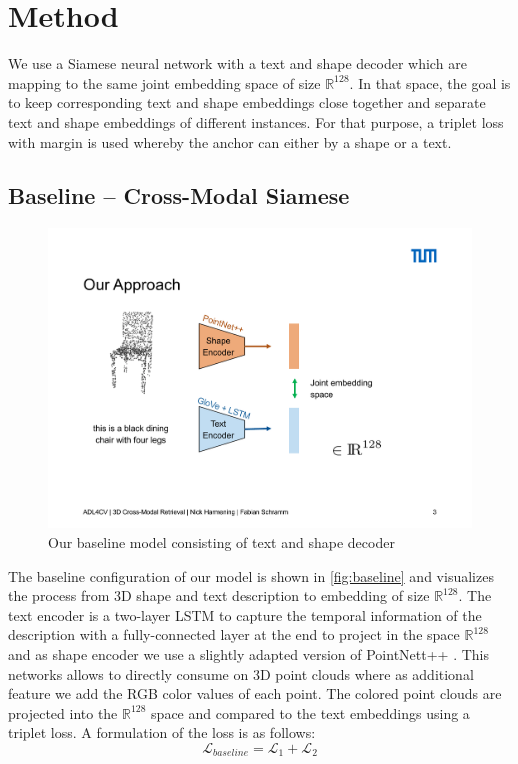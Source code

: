 \documentclass[10pt,twocolumn,letterpaper]{article}
\begin{document}
\section{Method}
We use a Siamese neural network with a text and shape decoder which are mapping to the same joint embedding space of size $\mathbb{R}^{128}$. In that space, the goal is to keep corresponding text and shape embeddings close together and separate text and shape embeddings of different instances. For that purpose, a triplet loss with margin is used whereby the anchor can either by a shape or a text. 
\subsection{Baseline -- Cross-Modal Siamese}
\begin{figure}[t]%
	\centering
	\includegraphics[width=0.8\linewidth]{fig3.pdf}
	\caption[]{Our baseline model consisting of text and shape decoder}
	\label{fig:baseline}
\end{figure}
The baseline configuration of our model is shown in \autoref{fig:baseline} and visualizes the process from 3D shape and text description to embedding of size $\mathbb{R}^{128}$. The text encoder is a two-layer LSTM to capture the temporal information of the description with a fully-connected layer at the end to project in the space $\mathbb{R}^{128}$ and as shape encoder we use a slightly adapted version of PointNett++ \cite{qi2017Pointnet++}. This networks allows to directly consume on 3D point clouds where as additional feature we add the RGB color values of each point. The colored point clouds are projected into the $\mathbb{R}^{128}$ space and compared to the text embeddings using a triplet loss. A formulation of the loss is as follows:
\begin{equation}
\label{eqn:1}
\mathcal{L}_{baseline} = \mathcal{L}_{1} + \mathcal{L}_{2}
\end{equation}
\end{document}
